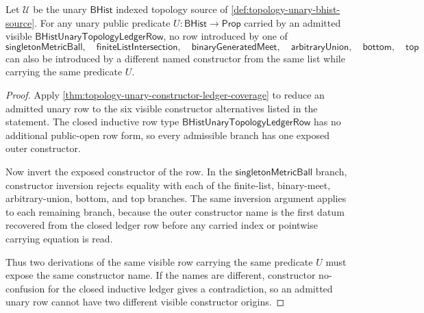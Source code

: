 \begin{theorem}
\label{thm:topology-unary-ledger-constructor-no-confusion}
Let $\mathcal{U}$ be the unary $\mathsf{BHist}$ indexed topology source of \autoref{def:topology-unary-bhist-source}. For any unary public predicate $U:\mathsf{BHist}\to\mathsf{Prop}$ carried by an admitted visible $\mathsf{BHistUnaryTopologyLedgerRow}$, no row introduced by one of
$$
\mathsf{singletonMetricBall},\quad
\mathsf{finiteListIntersection},\quad
\mathsf{binaryGeneratedMeet},\quad
\mathsf{arbitraryUnion},\quad
\mathsf{bottom},\quad
\mathsf{top}
$$
can also be introduced by a different named constructor from the same list while carrying the same predicate $U$.
\end{theorem}
\begin{proof}
Apply \autoref{thm:topology-unary-constructor-ledger-coverage} to reduce an admitted unary row to the six visible constructor alternatives listed in the statement. The closed inductive row type $\mathsf{BHistUnaryTopologyLedgerRow}$ has no additional public-open row form, so every admissible branch has one exposed outer constructor.

Now invert the exposed constructor of the row. In the $\mathsf{singletonMetricBall}$ branch, constructor inversion rejects equality with each of the finite-list, binary-meet, arbitrary-union, bottom, and top branches. The same inversion argument applies to each remaining branch, because the outer constructor name is the first datum recovered from the closed ledger row before any carried index or pointwise carrying equation is read.

Thus two derivations of the same visible row carrying the same predicate $U$ must expose the same constructor name. If the names are different, constructor no-confusion for the closed inductive ledger gives a contradiction, so an admitted unary row cannot have two different visible constructor origins.
\end{proof}

